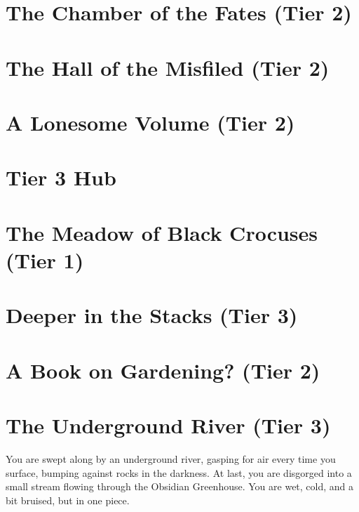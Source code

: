 \documentclass[sheet]{GL2020}
\begin{document}
\clearpage

\section*{The Chamber of the Fates (Tier 2)}
\label{ChamberoftheFates}

\clearpage

\section*{The Hall of the Misfiled (Tier 2)}
\label{HallMisfiled}

\clearpage

\section*{A Lonesome Volume (Tier 2)}
\label{LonesomeVolume}

\clearpage



\section*{Tier 3 Hub}
\label{TierThreeHub}

\clearpage

\section*{The Meadow of Black Crocuses (Tier 1)}
\label{MeadowofBlackCrocuses}

\clearpage

\section*{Deeper in the Stacks (Tier 3)}
\label{DeeperStacks}

\clearpage

\section*{A Book on Gardening? (Tier 2)}
\label{BookonGardening}

\clearpage

\section*{The Underground River (Tier 3)}
\label{UndergroundRiver}

You are swept along by an underground river, gasping for air every time you surface, bumping against rocks in the darkness. At last, you are disgorged into a small stream flowing through the Obsidian Greenhouse. You are wet, cold, and a bit bruised, but in one piece.
\end{document}
